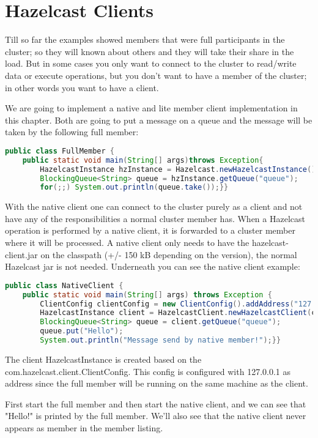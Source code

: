 \chapter{Hazelcast Clients}
Till so far the examples showed members that were full participants in the cluster; so they will known about others and they will take their share in the load. But in some cases you only want to connect to the cluster to read/write data or execute operations, but you don't want to have a member of the cluster; in other words you want to have a client.

We are going to implement a native and lite member client implementation in this chapter. Both are going to put a message on a queue and the message will be taken by the following full member:
\begin{lstlisting}[language=java]
public class FullMember {
    public static void main(String[] args)throws Exception{
        HazelcastInstance hzInstance = Hazelcast.newHazelcastInstance();
        BlockingQueue<String> queue = hzInstance.getQueue("queue");
        for(;;) System.out.println(queue.take());}}
\end{lstlisting}

With the native client one can connect to the cluster purely as a client and not have any of the responsibilities a normal cluster member has. When a Hazelcast operation is performed by a native client, it is forwarded to a cluster member where it will be processed. A native client only needs to have the hazelcast-client.jar on the classpath (+/- 150 kB depending on the version), the normal Hazelcast jar is not needed. Underneath you can see the native client example:
\begin{lstlisting}[language=java]
public class NativeClient {
    public static void main(String[] args) throws Exception {
        ClientConfig clientConfig = new ClientConfig().addAddress("127.0.0.1");
        HazelcastInstance client = HazelcastClient.newHazelcastClient(clientConfig);
        BlockingQueue<String> queue = client.getQueue("queue");
        queue.put("Hello");
        System.out.println("Message send by native member!");}}
\end{lstlisting}
The client HazelcastInstance is created based on the com.hazelcast.client.ClientConfig. This config is configured with 127.0.0.1 as address since the full member will be running on the same machine as the client.

First start the full member and then start the native client, and we can see that "Hello!" is printed by the full member. We'll also see that the native client never appears as member in the member listing.	
 
